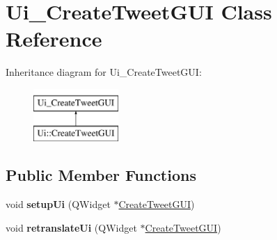 \hypertarget{classUi__CreateTweetGUI}{}\section{Ui\+\_\+\+Create\+Tweet\+G\+UI Class Reference}
\label{classUi__CreateTweetGUI}
Inheritance diagram for Ui\+\_\+\+Create\+Tweet\+G\+UI\+:\begin{figure}[H]
\begin{center}
\leavevmode
\includegraphics[height=2.000000cm]{classUi__CreateTweetGUI}
\end{center}
\end{figure}
\subsection*{Public Member Functions}
\begin{DoxyCompactItemize}
\item 
void {\bfseries setup\+Ui} (Q\+Widget $\ast$\hyperlink{classCreateTweetGUI}{Create\+Tweet\+G\+UI})\hypertarget{classUi__CreateTweetGUI_abfd4a91cc51a2d02f2103886193bbddb}{}\label{classUi__CreateTweetGUI_abfd4a91cc51a2d02f2103886193bbddb}

\item 
void {\bfseries retranslate\+Ui} (Q\+Widget $\ast$\hyperlink{classCreateTweetGUI}{Create\+Tweet\+G\+UI})\hypertarget{classUi__CreateTweetGUI_a28d872660e5fda4c37234e76aa6c6435}{}\label{classUi__CreateTweetGUI_a28d872660e5fda4c37234e76aa6c6435}

\end{DoxyCompactItemize}
